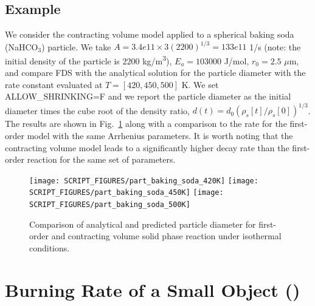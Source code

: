 \documentclass[11pt]{book}
\begin{document}
\subsection*{Example}

We consider the contracting volume model applied to a spherical baking soda (NaHCO$_3$) particle.  We take $A = 3.4e11 \times 3(2200)^{1/3} = 133e11$ 1/s (note: the initial density of the particle is $2200$ \si{kg/m^3}), $E_a = 103000$ J/mol, $r_0 = 2.5$ $\mu$m, and compare FDS with the analytical solution for the particle diameter with the rate constant evaluated at $T=[420, 450, 500]$ K.  We set {\ct ALLOW\_SHRINKING=F} and we report the particle diameter as the initial diameter times the cube root of the density ratio, $d(t) = d_0 (\rho_{s}[t]/\rho_s[0])^{1/3}$.  The results are shown in Fig.~\ref{fig:part_baking_soda} along with a comparison to the rate for the first-order model with the same Arrhenius parameters.  It is worth noting that the contracting volume model leads to a significantly higher decay rate than the first-order reaction for the same set of parameters.

\begin{figure}[!h]
\centering
\texttt{[image: SCRIPT\_FIGURES/part\_baking\_soda\_420K]}
\texttt{[image: SCRIPT\_FIGURES/part\_baking\_soda\_450K]}
\texttt{[image: SCRIPT\_FIGURES/part\_baking\_soda\_500K]}
\caption[The  test cases]{Comparison of analytical and predicted particle diameter for first-order and contracting volume solid phase reaction under isothermal conditions.}
\label{fig:part_baking_soda}
\end{figure}



\section{Burning Rate of a Small Object (\texorpdfstring{}{cell\_burn\_away})}
\label{cell_burn_away}
\end{document}
